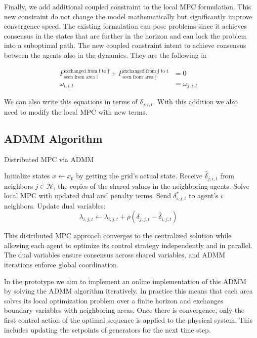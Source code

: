 \documentclass{article}
\begin{document}
Finally, we add additional coupled constraint to the local MPC formulation. This new constraint do not change the model mathematically but significantly improve convergence speed. The existing formulation can pose problems since it achieves consensus in the states that are further in the horizon and can lock the problem into a suboptimal path. The new coupled constraint intent to achieve consensus between the agents also in the dynamics. They are the following in 

\begin{align}
    P_{\text{seen from area i}}^{\text{exchanged from i to j}} + P_{\text{seen from area j}}^{\text{exchanged from j to i}} &= 0 \\
    \omega_{i,i,t} &= \omega_{j,i,t}
\end{align}

We can also write this equations in terms of $\delta_{j,i,t}$. With this addition we also need to modify the local MPC with new terms. 

\subsection{ADMM Algorithm}

\begin{algorithm}[H]
\caption{Distributed MPC via ADMM}
\begin{algorithmic}[1]
    \State Initialize states $x \gets x_0$ by getting the grid's actual state.
            \State Receive $\hat{\delta}_{j,i,t}$ from neighbors $j \in \mathcal{N}_i$ the copies of the shared values in the neighboring agents.
            \State Solve local MPC with updated dual and penalty terms.
            \State Send $\delta^*_{i,j,t}$ to agent's $i$ neighbors. 
        \EndFor
            \State Update dual variables:
            \[
                \lambda_{i,j,t} \gets \lambda_{i,j,t} + \rho (\delta_{j,j,t} - \hat{\delta}_{i,j,t})
            \]
        \EndFor
    \EndWhile
\end{algorithmic}
\end{algorithm}

This distributed MPC approach converges to the centralized solution while allowing each agent to optimize its control strategy independently and in parallel. The dual variables ensure consensus across shared variables, and ADMM iterations enforce global coordination. 

In the prototype we aim to implement an online implementation of this ADMM by solving the ADMM algorithm iteratively. In practice this means that each area solves its local optimization problem over a finite horizon and exchanges boundary variables  with neighboring areas. Once there is convergence, only the first control action of the optimal sequence is applied to the physical system. This includes updating the setpoints of generators for the next time step. 
\end{document}
